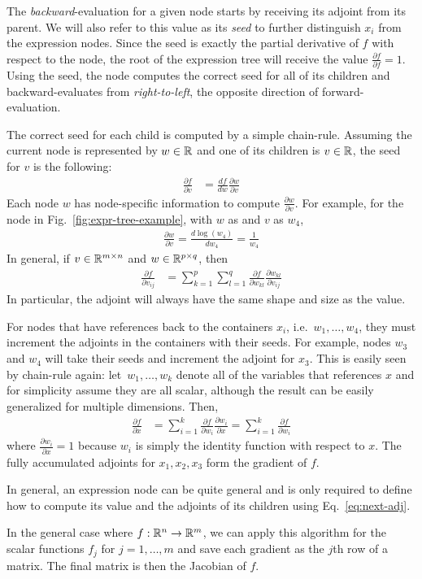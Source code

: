The \emph{backward}-evaluation for a given node starts by receiving its adjoint from its parent.
We will also refer to this value as its \emph{seed} to further distinguish $x_i$ from the expression nodes.
Since the seed is exactly the partial derivative of $f$ with respect to the node,
the root of the expression tree will receive the value $ \frac{\partial f}{\partial f} = 1$.
Using the seed, the node computes the correct seed for all of its children and 
backward-evaluates from \emph{right-to-left}, the opposite direction of forward-evaluation.

The correct seed for each child is computed by a simple chain-rule.
Assuming the current node is represented by $w \in \mathbb{R}$ and one of its children is $v \in \mathbb{R}$,
the seed for $v$ is the following:
\begin{align}
    \frac{\partial f}{\partial v} &=
    \frac{df}{dw} \frac{\partial w}{\partial v} \label{eq:next-seed}
\end{align}
Each node $w$ has node-specific information to compute $\frac{\partial w}{\partial v}$.
For example, for the  node in Fig.~\ref{fig:expr-tree-example},
with $w$ as  and $v$ as $w_4$,
\begin{align*}
    \frac{\partial w}{\partial v} = \frac{d\log(w_4)}{dw_4} = \frac{1}{w_4}
\end{align*}
In general, if $v \in \mathbb{R}^{m \times n}$ and $w \in \mathbb{R}^{p \times q}$, then
\begin{align}
    \frac{\partial f}{\partial v_{ij}} &=
        \sum\limits_{k=1}^p \sum\limits_{l=1}^q 
        \frac{\partial f}{\partial w_{kl}} \frac{\partial w_{kl}}{\partial v_{ij}}
    \label{eq:next-adj}
\end{align}
In particular, the adjoint will always have the same shape and size as the value.

For nodes that have references back to the containers $x_i$, i.e.\ $w_1,\ldots,w_4$,
they must increment the adjoints in the containers with their seeds.
For example, nodes $w_3$ and $w_4$ will take their seeds and increment the adjoint for $x_3$.
This is easily seen by chain-rule again: let~$w_1, \ldots, w_k$ denote all of the variables that 
references $x$ and for simplicity assume they are all scalar, 
although the result can be easily generalized for multiple dimensions.
Then,
\begin{align*}
    \frac{\partial f}{\partial x} 
    &=  \sum\limits_{i=1}^k
        \frac{\partial f}{\partial w_{i}} \frac{\partial w_{i}}{\partial x}
    =   \sum\limits_{i=1}^k
        \frac{\partial f}{\partial w_{i}}
\end{align*}
where $\frac{\partial w_i}{\partial x} = 1$ because $w_i$ is simply the identity function with respect to $x$.
The fully accumulated adjoints for $x_1, x_2, x_3$ form the gradient of $f$.

In general, an expression node can be quite general and 
is only required to define how to compute its value and 
the adjoints of its children using Eq.~\ref{eq:next-adj}.

In the general case where $f: \mathbb{R}^n \to \mathbb{R}^m$,
we can apply this algorithm for the scalar functions $f_j$ for $j = 1,\ldots,m$ and
save each gradient as the $j$th row of a matrix.
The final matrix is then the Jacobian of $f$.

